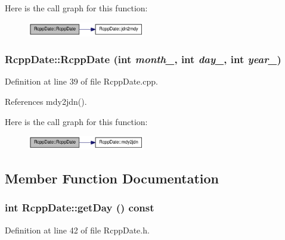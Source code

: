 Here is the call graph for this function:\nopagebreak
\begin{figure}[H]
\begin{center}
\leavevmode
\includegraphics[width=145pt]{classRcppDate_a21adf306ddf84cf792f888d220bb9a3f_cgraph}
\end{center}
\end{figure}
\hypertarget{classRcppDate_a8b96145664d63ec84267870787025fa4}{
\subsubsection[{RcppDate}]{\setlength{\rightskip}{0pt plus 5cm}RcppDate::RcppDate (int {\em month\_\-}, \/  int {\em day\_\-}, \/  int {\em year\_\-})}}
\label{classRcppDate_a8b96145664d63ec84267870787025fa4}


Definition at line 39 of file RcppDate.cpp.

References mdy2jdn().

Here is the call graph for this function:\nopagebreak
\begin{figure}[H]
\begin{center}
\leavevmode
\includegraphics[width=145pt]{classRcppDate_a8b96145664d63ec84267870787025fa4_cgraph}
\end{center}
\end{figure}


\subsection{Member Function Documentation}
\hypertarget{classRcppDate_a20efbcdddceac536425407b3169fff5a}{
\subsubsection[{getDay}]{\setlength{\rightskip}{0pt plus 5cm}int RcppDate::getDay () const}}
\label{classRcppDate_a20efbcdddceac536425407b3169fff5a}


Definition at line 42 of file RcppDate.h.

